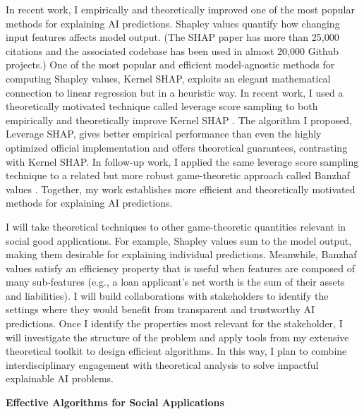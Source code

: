 \documentclass[11pt]{article}
\begin{document}
{In recent work, I empirically and theoretically improved one of the most popular methods for explaining AI predictions. Shapley values quantify how changing input features affects model output. (The SHAP paper has more than 25,000 citations and the associated codebase has been used in almost 20,000 Github projects.) One of the most popular and efficient model-agnostic methods for computing Shapley values, Kernel SHAP, exploits an elegant mathematical connection to linear regression but in a heuristic way. In recent work, I used a theoretically motivated technique called leverage score sampling to both empirically and theoretically improve Kernel SHAP \cite{musco2024leverage}. The algorithm I proposed, Leverage SHAP, gives better empirical performance than even the highly optimized official implementation and offers theoretical guarantees, contrasting with Kernel SHAP. In follow-up work, I applied the same leverage score sampling technique to a related but more robust game-theoretic approach called Banzhaf values \cite{liu2024kernel}. Together, my work establishes more efficient and theoretically motivated methods for explaining AI predictions.

I will take theoretical techniques to other game-theoretic quantities relevant in social good applications.
For example, Shapley values sum to the model output, making them desirable for explaining individual predictions.
Meanwhile, Banzhaf values satisfy an efficiency property that is useful when features are composed of many sub-features (e.g., a loan applicant's net worth is the sum of their assets and liabilities).
I will build collaborations with stakeholders to identify the settings where they would benefit from transparent and trustworthy AI predictions.
Once I identify the properties most relevant for the stakeholder, I will investigate the structure of the problem and apply tools from my extensive theoretical toolkit to design efficient algorithms.
In this way, I plan to combine interdisciplinary engagement with theoretical analysis to solve impactful explainable AI problems.

{ \large \textbf{Effective Algorithms for Social Applications}}

}
\end{document}
